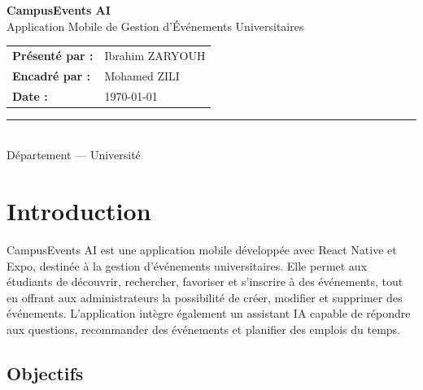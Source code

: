 \documentclass[12pt,a4paper]{article}
\begin{document}
\begin{titlepage}
    \centering
    \vspace*{2cm}
    
    {\Huge\bfseries\color{primarycolor} CampusEvents AI}\\[0.5cm]
    {\Large Application Mobile de Gestion d'Événements Universitaires}\\[2cm]
    
    \vspace{1cm}
    
    \begin{minipage}{0.6\textwidth}
        \begin{tabular}{ll}
            \textbf{Présenté par :} & Ibrahim ZARYOUH \\[0.3cm]
            \textbf{Encadré par :}  & Mohamed ZILI \\[0.3cm]
            \textbf{Date :}         & \today \\
        \end{tabular}
    \end{minipage}
    
    \vspace{2cm}
    
    \rule{0.6\textwidth}{0.5pt}\\[1cm]
    
    \large Département --- Université
    
    \vfill
\end{titlepage}

\newpage
\tableofcontents
\newpage

\section{Introduction}

CampusEvents AI est une application mobile développée avec React Native et Expo, destinée à la gestion d'événements universitaires. Elle permet aux étudiants de découvrir, rechercher, favoriser et s'inscrire à des événements, tout en offrant aux administrateurs la possibilité de créer, modifier et supprimer des événements. L'application intègre également un assistant IA capable de répondre aux questions, recommander des événements et planifier des emplois du temps.

\subsection{Objectifs}
\end{document}

